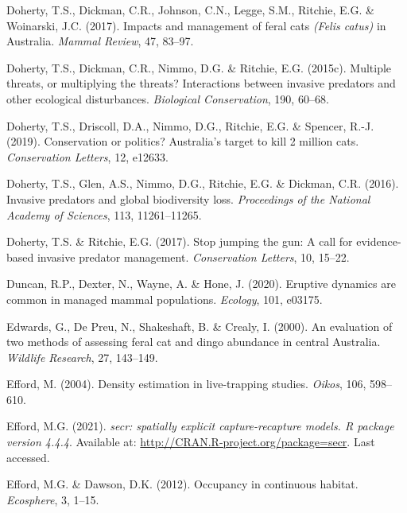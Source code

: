 \documentclass[11pt,a4paper,titlepage,twoside,openright]{style/unimelbthesis}
\begin{document}
\begin{mainmatter}
\leavevmode\hypertarget{ref-doherty2017impacts}{}%
Doherty, T.S., Dickman, C.R., Johnson, C.N., Legge, S.M., Ritchie, E.G. \& Woinarski, J.C. (2017). Impacts and management of feral cats \emph{(Felis catus)} in Australia. \emph{Mammal Review}, 47, 83--97.

\leavevmode\hypertarget{ref-doherty2015multiple}{}%
Doherty, T.S., Dickman, C.R., Nimmo, D.G. \& Ritchie, E.G. (2015c). Multiple threats, or multiplying the threats? Interactions between invasive predators and other ecological disturbances. \emph{Biological Conservation}, 190, 60--68.

\leavevmode\hypertarget{ref-doherty2019conservation}{}%
Doherty, T.S., Driscoll, D.A., Nimmo, D.G., Ritchie, E.G. \& Spencer, R.-J. (2019). Conservation or politics? Australia's target to kill 2 million cats. \emph{Conservation Letters}, 12, e12633.

\leavevmode\hypertarget{ref-doherty2016invasive}{}%
Doherty, T.S., Glen, A.S., Nimmo, D.G., Ritchie, E.G. \& Dickman, C.R. (2016). Invasive predators and global biodiversity loss. \emph{Proceedings of the National Academy of Sciences}, 113, 11261--11265.

\leavevmode\hypertarget{ref-doherty2017stop}{}%
Doherty, T.S. \& Ritchie, E.G. (2017). Stop jumping the gun: A call for evidence-based invasive predator management. \emph{Conservation Letters}, 10, 15--22.

\leavevmode\hypertarget{ref-duncan2020eruptive}{}%
Duncan, R.P., Dexter, N., Wayne, A. \& Hone, J. (2020). Eruptive dynamics are common in managed mammal populations. \emph{Ecology}, 101, e03175.

\leavevmode\hypertarget{ref-edwards2000evaluation}{}%
Edwards, G., De Preu, N., Shakeshaft, B. \& Crealy, I. (2000). An evaluation of two methods of assessing feral cat and dingo abundance in central Australia. \emph{Wildlife Research}, 27, 143--149.

\leavevmode\hypertarget{ref-efford2004density}{}%
Efford, M. (2004). Density estimation in live-trapping studies. \emph{Oikos}, 106, 598--610.

\leavevmode\hypertarget{ref-efford2021secr}{}%
Efford, M.G. (2021). \emph{secr: spatially explicit capture-recapture models. R package version 4.4.4}. Available at: \url{http://CRAN.R-project.org/package=secr}. Last accessed.

\leavevmode\hypertarget{ref-efford2012occupancy}{}%
Efford, M.G. \& Dawson, D.K. (2012). Occupancy in continuous habitat. \emph{Ecosphere}, 3, 1--15.


\end{mainmatter}
\end{document}
